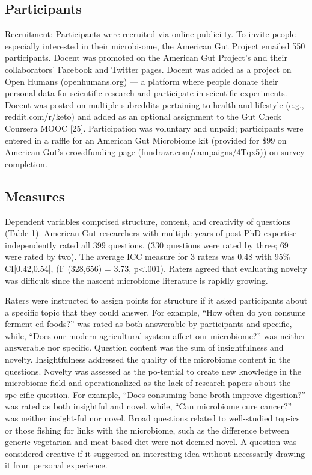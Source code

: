\subsection{Participants}
Recruitment: Participants were recruited via online publici-ty. To invite people especially interested in their microbi-ome, the American Gut Project emailed 550 participants. Docent was promoted on the American Gut Project’s and their collaborators’ Facebook and Twitter pages. Docent was added as a project on Open Humans (openhumans.org) — a platform where people donate their personal data for scientific research and participate in scientific experiments. Docent was posted on multiple subreddits pertaining to health and lifestyle (e.g., reddit.com/r/keto) and added as an optional assignment to the Gut Check Coursera MOOC [25]. Participation was voluntary and unpaid; participants were entered in a raffle for an American Gut Microbiome kit (provided for \$99 on American Gut’s crowdfunding page (fundrazr.com/campaigns/4Tqx5)) on survey completion.

\subsection{Measures}
Dependent variables comprised structure, content, and creativity of questions (Table 1). American Gut researchers with multiple years of post-PhD expertise independently rated all 399 questions. (330 questions were rated by three; 69 were rated by two). The average ICC measure for 3 raters was 0.48 with 95\% CI[0.42,0.54], (F (328,656) = 3.73, p<.001). Raters agreed that evaluating novelty was difficult since the nascent microbiome literature is rapidly growing.

Raters were instructed to assign points for structure if it asked participants about a specific topic that they could answer. For example, “How often do you consume ferment-ed foods?” was rated as both answerable by participants and specific, while, “Does our modern agricultural system affect our microbiome?” was neither answerable nor specific. Question content was the sum of insightfulness and novelty. Insightfulness addressed the quality of the microbiome content in the questions. Novelty was assessed as the po-tential to create new knowledge in the microbiome field and operationalized as the lack of research papers about the spe-cific question. For example, “Does consuming bone broth improve digestion?” was rated as both insightful and novel, while, “Can microbiome cure cancer?” was neither insight-ful nor novel. Broad questions related to well-studied top-ics or those fishing for links with the microbiome, such as the difference between generic vegetarian and meat-based diet were not deemed novel. A question was considered creative if it suggested an interesting idea without necessarily drawing it from personal experience. 

